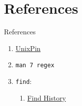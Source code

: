 \documentclass[11pt]{beamer}
\begin{document}

	\section{References}
		\begin{frame}{References}
			\begin{enumerate}
				\item \href{http://find.unixpin.com/}{UnixPin}
				\item \texttt{man 7 regex}
				\item {
						\texttt{find}:
						\begin{enumerate}
							\item \href{http://doc.cat-v.org/unix/find-history}{Find History}
						\end{enumerate}
					}
			\end{enumerate}
		\end{frame}
\end{document}
